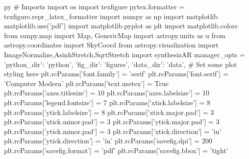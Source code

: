 \begin{pythontexcustomcode}{py}
# Imports
import os
import texfigure
pytex.formatter = texfigure.repr_latex_formatter
import numpy as np
import matplotlib
matplotlib.use('pdf')
import matplotlib.pyplot as plt
import matplotlib.colors
from sunpy.map import Map, GenericMap
import astropy.units as u
from astropy.coordinates import SkyCoord
from astropy.visualization import ImageNormalize,AsinhStretch,SqrtStretch
import synthesizAR
manager_opts = {'python_dir': 'python', 'fig_dir': 'figures', 'data_dir': 'data',}
# Set some plot styling here
plt.rcParams['font.family'] = 'serif'
plt.rcParams['font.serif'] = 'Computer Modern'
plt.rcParams['text.usetex'] = True
plt.rcParams['axes.titlesize'] = 10
plt.rcParams['axes.labelsize'] = 10
plt.rcParams['legend.fontsize'] = 7
plt.rcParams['xtick.labelsize'] = 8
plt.rcParams['ytick.labelsize'] = 8
plt.rcParams['xtick.major.pad'] = 3
plt.rcParams['xtick.minor.pad'] = 3
plt.rcParams['ytick.major.pad'] = 3
plt.rcParams['ytick.minor.pad'] = 3
plt.rcParams['xtick.direction'] = 'in'
plt.rcParams['ytick.direction'] = 'in'
plt.rcParams['savefig.dpi'] = 200
plt.rcParams['savefig.format'] = 'pdf'
plt.rcParams['savefig.bbox'] = 'tight'
\end{pythontexcustomcode}
